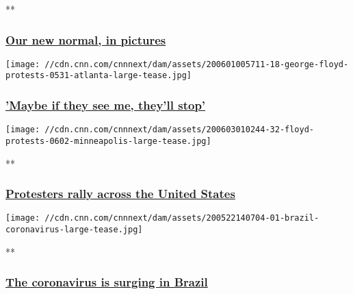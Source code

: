 **

\hypertarget{our-new-normal-in-pictures}{%
\subsubsection{\texorpdfstring{\href{/2020/05/20/world/gallery/new-normal-coronavirus/index.html}{Our
new normal, in
pictures}}{Our new normal, in pictures}}\label{our-new-normal-in-pictures}}

\href{/2020/06/19/us/young-protester-atlanta-kai-ayden-cnnphotos/index.html}{}

\texttt{[image: //cdn.cnn.com/cnnnext/dam/assets/200601005711-18-george-floyd-protests-0531-atlanta-large-tease.jpg]}

\hypertarget{maybe-if-they-see-me-theyll-stop}{%
\subsubsection{\texorpdfstring{\href{/2020/06/19/us/young-protester-atlanta-kai-ayden-cnnphotos/index.html}{'Maybe
if they see me, they'll
stop'}}{'Maybe if they see me, they'll stop'}}\label{maybe-if-they-see-me-theyll-stop}}

\href{/2020/05/27/us/gallery/george-floyd-demonstrations/index.html}{}

\texttt{[image: //cdn.cnn.com/cnnnext/dam/assets/200603010244-32-floyd-protests-0602-minneapolis-large-tease.jpg]}

**

\hypertarget{protesters-rally-across-the-united-states}{%
\subsubsection{\texorpdfstring{\href{/2020/05/27/us/gallery/george-floyd-demonstrations/index.html}{Protesters
rally across the United
States}}{Protesters rally across the United States}}\label{protesters-rally-across-the-united-states}}

\href{/2020/05/22/americas/gallery/brazil-coronavirus/index.html}{}

\texttt{[image: //cdn.cnn.com/cnnnext/dam/assets/200522140704-01-brazil-coronavirus-large-tease.jpg]}

**

\hypertarget{the-coronavirus-is-surging-in-brazil}{%
\subsubsection{\texorpdfstring{\href{/2020/05/22/americas/gallery/brazil-coronavirus/index.html}{The
coronavirus is surging in
Brazil}}{The coronavirus is surging in Brazil}}\label{the-coronavirus-is-surging-in-brazil}}


